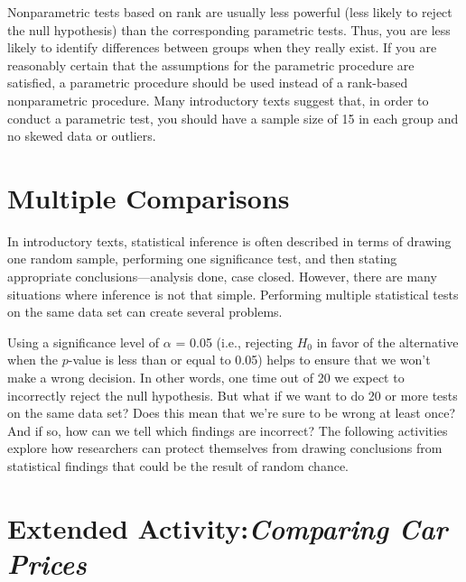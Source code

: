 \documentclass[
]{report}
\begin{document}
Nonparametric tests based on rank are usually less powerful (less likely to reject the null hypothesis) than the corresponding parametric tests. Thus, you are less likely to identify differences between groups when they really exist. If you are reasonably certain that the assumptions for the parametric procedure are satisfied, a parametric procedure should be used instead of a rank-based nonparametric procedure. Many introductory texts suggest that, in order to conduct a parametric test, you should have a sample size of 15 in each group and no skewed data or outliers.

\hypertarget{multiple-comparisons}{%
\section{\texorpdfstring{\textbf{Multiple Comparisons}}{Multiple Comparisons}}\label{multiple-comparisons}}

In introductory texts, statistical inference is often described in terms of drawing one random sample, performing one significance test, and then stating appropriate conclusions---analysis done, case closed. However, there are many situations where inference is not that simple. Performing multiple statistical tests on the same data set can create several problems.

Using a significance level of \(\alpha\) = 0.05 (i.e., rejecting \(H_0\) in favor of the alternative when the \(p\)-value is less than or equal to 0.05) helps to ensure that we won't make a wrong decision. In other words, one time out of 20 we expect to incorrectly reject the null hypothesis. But what if we want to do 20 or more tests on the same data set? Does this mean that we're sure to be wrong at least once? And if so, how can we tell which findings are incorrect? The following activities explore how researchers can protect themselves from drawing conclusions from statistical findings that could be the result of random chance.

\hypertarget{extended-activitycomparing-car-prices}{%
\section*{\texorpdfstring{Extended Activity:\emph{Comparing Car Prices}}{Extended Activity:Comparing Car Prices}}\label{extended-activitycomparing-car-prices}}
\end{document}

